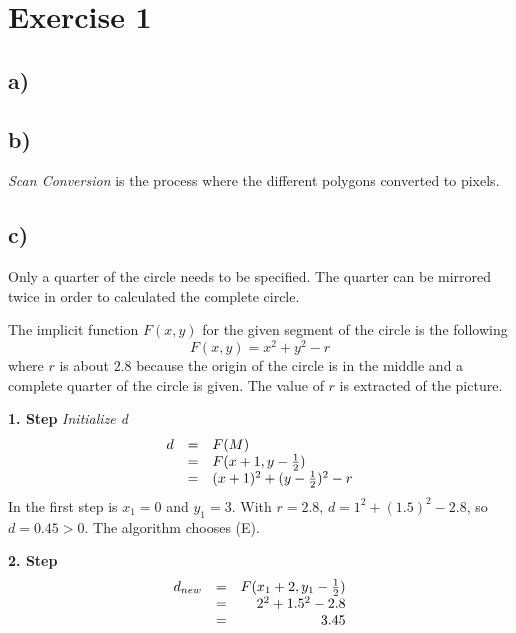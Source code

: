 \documentclass[10pt]{article}
\begin{document}
\section*{Exercise 1}
  \subsection*{a)}
  \subsection*{b)}
    \emph{Scan Conversion} is the process where the different polygons converted
    to pixels.
  \subsection*{c)}
    Only a quarter of the circle needs to be specified. The quarter can be
    mirrored twice in order to calculated the complete circle. 
    
    The implicit function $F(x,y)$ for the given segment of the circle is the
    following
    \begin{displaymath}
      F(x,y)= x^2 + y^2 - r
    \end{displaymath}
    where $r$ is about $2.8$ because the origin of the circle is in the middle
    and a complete quarter of the circle is given. The value of $r$ is extracted
    of the picture.
  
    \textbf{1. Step} \emph{Initialize d}
    \begin{displaymath}
      \begin{array}{ r c l }
        d & = &F(M) \\
          & = &F(x+1,y-\frac{1}{2}) \\
          & = &(x+1)^2+(y-\frac{1}{2})^2-r
      \end{array}
    \end{displaymath}
    In the first step is $x_1=0$ and $y_1=3$. With $r=2.8$, $d=1^2+(1.5)^2-2.8$, so
    $d=0.45>0$. The algorithm chooses (E).

    \textbf{2. Step}
    \begin{displaymath}
      \begin{array}{ l c r }
        d_{new} & = & F(x_1+2,y_1-\frac{1}{2}) \\
                & = & 2^2+1.5^2-2.8 \\
                & = & 3.45
      \end{array}
    \end{displaymath}
\end{document}
